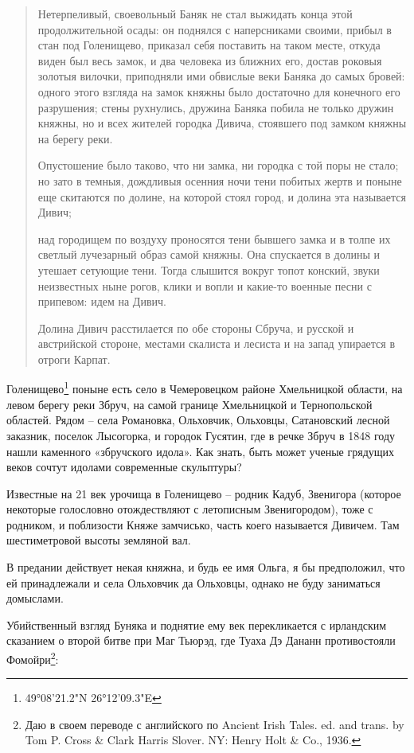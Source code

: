 \begin{quotation}
Нетерпеливый, своевольный Баняк не стал выжидать конца этой продолжительной осады: он поднялся с наперсниками своими, прибыл в стан под Голенищево, приказал себя поставить на таком месте, откуда виден был весь замок, и два человека из ближних его, достав роковыя золотыя вилочки, приподняли ими обвислые веки Баняка до самых бровей: одного этого взгляда на замок княжны было достаточно для конечного его разрушения; стены рухнулись, дружина Баняка побила не только дружин княжны, но и всех жителей городка Дивича, стоявшего под замком княжны на берегу реки.

Опустошение было таково, что ни замка, ни городка с той поры не стало; но зато в темныя, дождливыя осенния ночи тени побитых жертв и поныне еще скитаются по долине, на которой стоял город, и долина эта называется Дивич;

над городищем по воздуху проносятся тени бывшего замка и в толпе их светлый лучезарный образ самой княжны. Она спускается в долины и утешает сетующие тени. Тогда слышится вокруг топот конский, звуки неизвестных ныне рогов, клики и вопли и какие-то военные песни с припевом: идем на Дивич.

Долина Дивич расстилается по обе стороны Сбруча, и русской и австрийской стороне, местами скалиста и лесиста и на запад упирается в отроги Карпат.
\end{quotation}

Голенищево\footnote{49°08'21.2"N 26°12'09.3"E} поныне есть село в Чемеровецком районе Хмельницкой области, на левом берегу реки Збруч, на самой границе Хмельницкой и Тернопольской областей. Рядом – села Романовка, Ольховчик, Ольховцы, Сатановский лесной заказник, поселок Лысогорка, и городок Гусятин, где в речке Збруч в 1848 году нашли каменного «збручского идола». Как знать, быть может ученые грядущих веков сочтут идолами современные скульптуры?

Известные на 21 век урочища в Голенищево – родник Кадуб, Звенигора (которое некоторые голословно отождествляют с летописным Звенигородом), тоже с родником, и поблизости Княже замчисько, часть коего называется Дивичем. Там шестиметровой высоты земляной вал.

В предании действует некая княжна, и будь ее имя Ольга, я бы предположил, что ей принадлежали и села Ольховчик да Ольховцы, однако не буду заниматься домыслами.

Убийственный взгляд Буняка и поднятие ему век перекликается с ирландским сказанием о второй битве при Маг Тьюрэд, где Туаха Дэ Дананн противостояли Фомойри\footnote{Даю в своем переводе с английского по Ancient Irish Tales. ed. and trans. by Tom P. Cross \& Clark Harris Slover. NY: Henry Holt \& Co., 1936.}:

